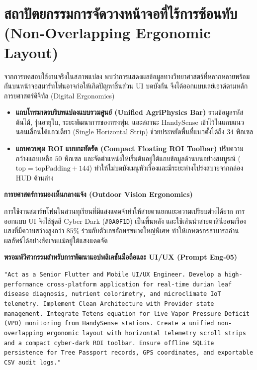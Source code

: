 \section{สถาปัตยกรรมการจัดวางหน้าจอที่ไร้การซ้อนทับ (Non-Overlapping Ergonomic Layout)}
จากการทดสอบใช้งานจริงในสภาพแปลง พบว่าการแสดงผลข้อมูลทางวิทยาศาสตร์ที่หลากหลายพร้อมกันบนหน้าจอสมาร์ทโฟนอาจก่อให้เกิดปัญหาชิ้นส่วน UI บดบังกัน จึงได้ออกแบบเลย์เอาต์ตามหลักการยศาสตร์ดิจิทัล (Digital Ergonomics)
\begin{itemize}
  \item \textbf{แถบโทรมาตรบริบทแปลงแบบรวมศูนย์ (Unified AgriPhysics Bar)} รวมข้อมูลรหัสต้นไม้, รุ่นอายุใบ, ระยะพัฒนาการของทรงพุ่ม, และสถานะ HandySense เข้าไว้ในแถบแนวนอนเลื่อนได้แถวเดียว (Single Horizontal Strip) ช่วยประหยัดพื้นที่แนวตั้งได้ถึง $34$ พิกเซล
  \item \textbf{แถบควบคุม ROI แบบกะทัดรัด (Compact Floating ROI Toolbar)} ปรับความกว้างแถบเหลือ $50$ พิกเซล และจัดตำแหน่งให้เริ่มต้นอยู่ใต้แถบข้อมูลด้านบนอย่างสมบูรณ์ ($\text{top} = \text{topPadding} + 144$) ทำให้ไม่บดบังเมนูหัวเรื่องและมีระยะห่างโปร่งสบายจากกล่อง HUD ด้านล่าง
\end{itemize}

\begin{theorybox}
\textbf{การยศาสตร์การมองเห็นกลางแจ้ง (Outdoor Vision Ergonomics)}\par
การใช้งานสมาร์ทโฟนในสวนทุเรียนที่มีแสงแดดจ้าทำให้สายตาแยกแยะความเปรียบต่างได้ยาก การออกแบบ UI จึงใช้ชุดสี Cyber Dark (\texttt{\#0A0F1D}) เป็นพื้นหลัง และใช้เส้นนำสายตาสีนีออนเรืองแสงที่มีความสว่างสูงกว่า $85\%$ ร่วมกับตัวเลขอักษรขนาดใหญ่พิเศษ ทำให้เกษตรกรสามารถอ่านผลลัพธ์ได้อย่างชัดเจนแม้อยู่ใต้แสงแดดจัด
\end{theorybox}

\begin{promptbox}
\textbf{พรอมพ์วิศวกรรมสำหรับการพัฒนาแอปพลิเคชันมือถือและ UI/UX (Prompt Eng-05)}\par
\texttt{"Act as a Senior Flutter and Mobile UI/UX Engineer. Develop a high-performance cross-platform application for real-time durian leaf disease diagnosis, nutrient colorimetry, and microclimate IoT telemetry. Implement Clean Architecture with Provider state management. Integrate Tetens equation for live Vapor Pressure Deficit (VPD) monitoring from HandySense stations. Create a unified non-overlapping ergonomic layout with horizontal telemetry scroll strips and a compact cyber-dark ROI toolbar. Ensure offline SQLite persistence for Tree Passport records, GPS coordinates, and exportable CSV audit logs."}
\end{promptbox}
